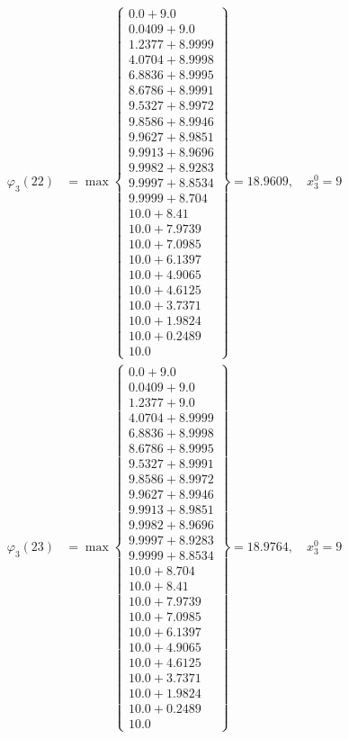 \documentclass{article}
\begin{document}
\begin{align*}
\varphi_{3}(22) &= \max \left\{ \begin{array}{c}
0.0 + 9.0 \\
 0.0409 + 9.0 \\
 1.2377 + 8.9999 \\
 4.0704 + 8.9998 \\
 6.8836 + 8.9995 \\
 8.6786 + 8.9991 \\
 9.5327 + 8.9972 \\
 9.8586 + 8.9946 \\
 9.9627 + 8.9851 \\
 9.9913 + 8.9696 \\
 9.9982 + 8.9283 \\
 9.9997 + 8.8534 \\
 9.9999 + 8.704 \\
 10.0 + 8.41 \\
 10.0 + 7.9739 \\
 10.0 + 7.0985 \\
 10.0 + 6.1397 \\
 10.0 + 4.9065 \\
 10.0 + 4.6125 \\
 10.0 + 3.7371 \\
 10.0 + 1.9824 \\
 10.0 + 0.2489 \\
 10.0
\end{array} \right\}=18.9609, \quad x_{3}^0=9\\
  
\varphi_{3}(23) &= \max \left\{ \begin{array}{c}
0.0 + 9.0 \\
 0.0409 + 9.0 \\
 1.2377 + 9.0 \\
 4.0704 + 8.9999 \\
 6.8836 + 8.9998 \\
 8.6786 + 8.9995 \\
 9.5327 + 8.9991 \\
 9.8586 + 8.9972 \\
 9.9627 + 8.9946 \\
 9.9913 + 8.9851 \\
 9.9982 + 8.9696 \\
 9.9997 + 8.9283 \\
 9.9999 + 8.8534 \\
 10.0 + 8.704 \\
 10.0 + 8.41 \\
 10.0 + 7.9739 \\
 10.0 + 7.0985 \\
 10.0 + 6.1397 \\
 10.0 + 4.9065 \\
 10.0 + 4.6125 \\
 10.0 + 3.7371 \\
 10.0 + 1.9824 \\
 10.0 + 0.2489 \\
 10.0
\end{array} \right\}=18.9764, \quad x_{3}^0=9\\
  

\end{align*}
\end{document}
